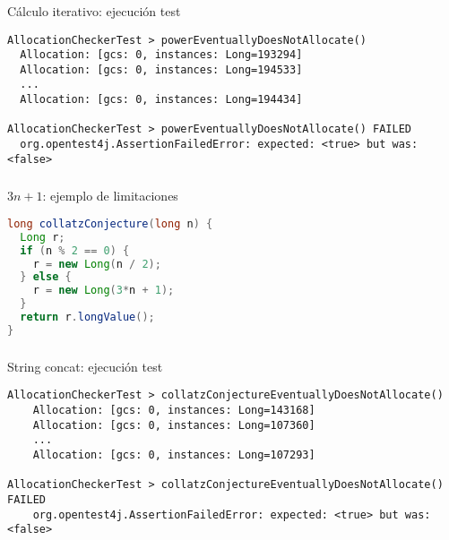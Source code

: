 \begin{frame}[fragile]
  \frametitle{\ft}
  \begin{block}{Cálculo iterativo: ejecución test}
    \begin{lstlisting}
AllocationCheckerTest > powerEventuallyDoesNotAllocate()
  Allocation: [gcs: 0, instances: Long=193294]
  Allocation: [gcs: 0, instances: Long=194533]
  ...
  Allocation: [gcs: 0, instances: Long=194434]

AllocationCheckerTest > powerEventuallyDoesNotAllocate() FAILED
  org.opentest4j.AssertionFailedError: expected: <true> but was: <false>
    \end{lstlisting}
  \end{block}
\end{frame}


\begin{frame}[fragile]
  \frametitle{\ft}
  \begin{block}{$3n+1$: ejemplo de limitaciones}
    \begin{lstlisting}[language=java]
long collatzConjecture(long n) {
  Long r;
  if (n % 2 == 0) {
    r = new Long(n / 2);
  } else {
    r = new Long(3*n + 1);
  }
  return r.longValue();
}
    \end{lstlisting}
  \end{block}
\end{frame}

\begin{frame}[fragile]
  \frametitle{\ft}
  \begin{block}{String concat: ejecución test}
    \begin{lstlisting}
AllocationCheckerTest > collatzConjectureEventuallyDoesNotAllocate()
    Allocation: [gcs: 0, instances: Long=143168]
    Allocation: [gcs: 0, instances: Long=107360]
    ...
    Allocation: [gcs: 0, instances: Long=107293]

AllocationCheckerTest > collatzConjectureEventuallyDoesNotAllocate() FAILED
    org.opentest4j.AssertionFailedError: expected: <true> but was: <false>
    \end{lstlisting}
  \end{block}
\end{frame}
